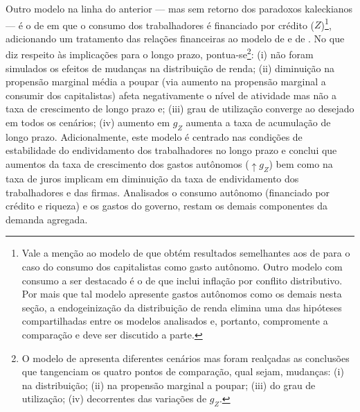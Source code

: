 

Outro modelo na linha do anterior --- mas sem retorno dos paradoxos kaleckianos --- é o de \textcite{mandarino_financing_2018} em que o consumo dos trabalhadores é financiado por crédito ($Z$)\footnote{
	Vale a menção ao modelo de \textcite{lavoie_convergence_2016} que obtém resultados semelhantes aos de \textcite{allain_tackling_2015} para o caso do consumo dos capitalistas como gasto autônomo. Outro modelo com consumo a ser destacado é o de \textcite{nah_role_2019} %
	que inclui inflação por conflito distributivo. Por mais que tal modelo apresente gastos autônomos como os demais nesta seção, a endogeinização da distribuição de renda elimina uma das hipóteses compartilhadas entre os modelos analisados e, portanto, compromente a comparação e deve ser discutido a parte.
}, adicionando um tratamento das relações financeiras ao modelo de \textcite{pariboni_household_2016} e de \textcite{fagundes_dinamica_2017}. No que diz respeito às implicações para o longo prazo, pontua-se\footnote{
	O modelo de \textcite{mandarino_financing_2018} apresenta diferentes cenários mas foram realçadas as conclusões que tangenciam os quatro pontos de comparação, qual sejam, mudanças: (i) na distribuição; (ii) na propensão marginal a poupar; (iii) do grau de utilização; (iv) decorrentes das variações de $g_Z$.
}: 
	(i) não foram simulados os efeitos de mudanças na distribuição de renda; 
	(ii) diminuição na propensão marginal média a poupar (via aumento na propensão marginal a consumir dos capitalistas) afeta negativamente o nível de atividade mas não a taxa de crescimento de longo prazo e; 
	(iii) grau de utilização converge ao desejado em todos os cenários; 
	(iv) aumento em $g_Z$ aumenta a taxa de acumulação de longo prazo.
Adicionalmente, este modelo é centrado nas condições de estabilidade do endividamento dos trabalhadores no longo prazo e conclui que aumentos da taxa de crescimento dos gastos autônomos ($\uparrow g_Z$) bem como na taxa de juros implicam em diminuição da taxa de endividamento dos trabalhadores e das firmas. Analisados o consumo autônomo (financiado por crédito e riqueza) e os gastos do governo, restam os demais componentes da demanda agregada.




